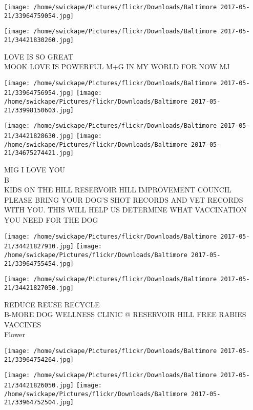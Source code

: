 \documentclass[10pt,letterpaper]{article}
\begin{document}
\texttt{[image: /home/swickape/Pictures/flickr/Downloads/Baltimore 2017-05-21/33964759054.jpg]}

\vspace{0.25in}
\texttt{[image: /home/swickape/Pictures/flickr/Downloads/Baltimore 2017-05-21/34421830260.jpg]}

LOVE IS SO GREAT\\
MOOK LOVE IS POWERFUL M+G IN MY WORLD FOR NOW MJ\\
\pagebreak

\texttt{[image: /home/swickape/Pictures/flickr/Downloads/Baltimore 2017-05-21/33964756954.jpg]}
\texttt{[image: /home/swickape/Pictures/flickr/Downloads/Baltimore 2017-05-21/33998150603.jpg]}

\texttt{[image: /home/swickape/Pictures/flickr/Downloads/Baltimore 2017-05-21/34421828630.jpg]}
\texttt{[image: /home/swickape/Pictures/flickr/Downloads/Baltimore 2017-05-21/34675274421.jpg]}

MIG I LOVE YOU\\
B\\
KIDS ON THE HILL RESERVOIR HILL IMPROVEMENT COUNCIL\\
PLEASE BRING YOUR DOG'S SHOT RECORDS AND VET RECORDS WITH YOU.  THIS WILL HELP US DETERMINE WHAT VACCINATION YOU NEED FOR THE DOG\\
\pagebreak

\texttt{[image: /home/swickape/Pictures/flickr/Downloads/Baltimore 2017-05-21/34421827910.jpg]}
\texttt{[image: /home/swickape/Pictures/flickr/Downloads/Baltimore 2017-05-21/33964755454.jpg]}

\texttt{[image: /home/swickape/Pictures/flickr/Downloads/Baltimore 2017-05-21/34421827050.jpg]}

REDUCE REUSE RECYCLE\\
B{-}MORE DOG WELLNESS CLINIC @ RESERVOIR HILL FREE RABIES VACCINES\\
Flower\\
\pagebreak

\texttt{[image: /home/swickape/Pictures/flickr/Downloads/Baltimore 2017-05-21/33964754264.jpg]}

\vspace{0.25in}
\texttt{[image: /home/swickape/Pictures/flickr/Downloads/Baltimore 2017-05-21/34421826050.jpg]}
\texttt{[image: /home/swickape/Pictures/flickr/Downloads/Baltimore 2017-05-21/33964752504.jpg]}
\end{document}
